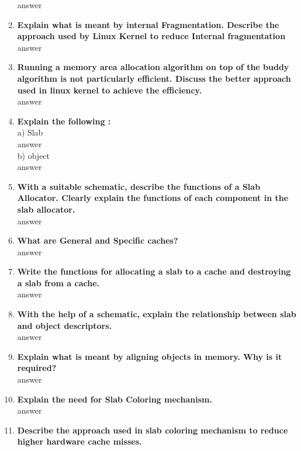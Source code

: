 \documentclass[a4paper,12pt]{article}
\begin{document}
\begin{flushleft}
\begin{enumerate}
{\color{red}answer}\\
\item \textbf{  Explain what is meant by internal Fragmentation. Describe the approach used by Linux Kernel to reduce Internal fragmentation}\\
{\color{red}answer}\\
\item \textbf{  Running a memory area allocation algorithm on top of the buddy algorithm is not particularly efficient. Discuss the better approach used in linux kernel to achieve the efficiency.}\\
{\color{red}answer}\\
\item \textbf{  Explain the following :}\\
a) Slab\\{\color{red}answer}\\
 b) object\\{\color{red}answer}\\
\item \textbf{  With a suitable schematic, describe the functions of a Slab Allocator. Clearly explain the functions of each component in the slab allocator.}\\
{\color{red}answer}\\
\item \textbf{  What are General and Specific caches?}\\
{\color{red}answer}\\
\item \textbf{  Write the functions for allocating a slab to a cache and destroying a slab from a cache.}\\
{\color{red}answer}\\
\item \textbf{  With the help of a schematic, explain the relationship between slab and object descriptors.}\\
{\color{red}answer}\\
\item \textbf{  Explain what is meant by aligning objects in memory. Why is it required?}\\
{\color{red}answer}\\
\item \textbf{  Explain the need for Slab Coloring mechanism.}\\
{\color{red}answer}\\
\item \textbf{  Describe the approach used in slab coloring mechanism to reduce higher hardware cache misses.}\\

\end{enumerate}
\end{flushleft}
\end{document}
